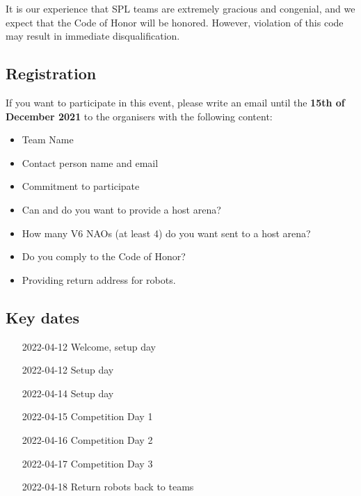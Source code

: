 It is our experience that SPL teams are extremely gracious and congenial, and we expect that the Code of Honor will be honored. However, violation of this code may result in immediate disqualification.

\subsection{Registration}

If you want to participate in this event, please write an email until the \textbf{15th of December 2021} to the organisers with the following content:
\begin{itemize}
    \item Team Name
    \item Contact person name and email
    \item Commitment to participate
    \item Can and do you want to provide a host arena?
    \item How many V6 NAOs (at least 4) do you want sent to a host arena?
    \item Do you comply to the Code of Honor?
    \item Providing return address for robots.
\end{itemize}

\subsection{Key dates}

\begin{itemize}[leftmargin=*,labelsep=0.7cm, labelindent=2cm]
    \item [2022-04-12] Welcome, setup day
    \item [2022-04-12] Setup day
    \item [2022-04-14] Setup day
    \item [2022-04-15] Competition Day 1
    \item [2022-04-16] Competition Day 2
    \item [2022-04-17] Competition Day 3
    \item [2022-04-18] Return robots back to teams
\end{itemize}
